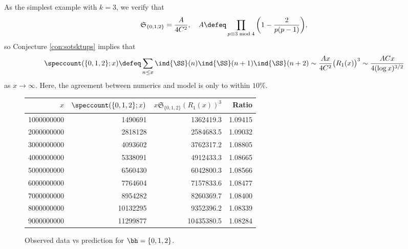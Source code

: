 \documentclass[12pt, reqno, twoside, letterpaper]{amsart}
\begin{document}
As the simplest example with $k = 3$, we verify that 
\[
  \mathfrak{S}_{\{0,1,2\}}
   =
    \frac{A}{4C^2}, 
     \quad 
      A 
      \defeq \prod_{p \equiv 3 \bmod 4}
       \bigg(1 - \frac{2}{p(p - 1)}\bigg),
\]
so Conjecture \ref{con:sotsktups} implies that 
\[
  \speccount(\{0,1,2\}; x)
   \defeq 
    \sum_{n \le x} \ind{\SS}(n)\ind{\SS}(n + 1)\ind{\SS}(n + 2)
     \sim 
      \frac{Ax}{4C^2}
       \big(R_1(x)\big)^3
        \sim 
         \frac{ACx}{4(\log x)^{3/2}}
\]
as $x \to \infty$.
%
Here, the agreement between numerics and model is only 
to within $10 \%$.

\begin{figure}[ht]
\begin{tabular}{|r|r|r|r|}
\hline
$x$ & {\small $\speccount(\{0,1,2\}; x)$ } & {\small $x\mathfrak{S}_{\{0,1,2\}}(R_1(x))^3$ } & Ratio \\
\hline
1000000000  &  1490691 &   1362419.3 & 1.09415  \\
2000000000  &  2818128 &   2584683.5 & 1.09032  \\
3000000000  &  4093602 &   3762317.2 & 1.08805  \\
4000000000  &  5338091 &   4912433.3 & 1.08665  \\
5000000000  &  6560430 &   6042800.3 & 1.08566  \\
6000000000  &  7764604 &   7157833.6 & 1.08477  \\
7000000000  &  8954282 &   8260369.7 & 1.08400  \\
8000000000  & 10132295 &   9352396.2 & 1.08339  \\
9000000000  & 11299877 &  10435380.5 & 1.08284  \\
\hline
\end{tabular}  
%
\caption{Observed data vs prediction for $\bh=\{0,1,2\}$. }
%
\label{fig:table2}
%
\end{figure}
\end{document}

